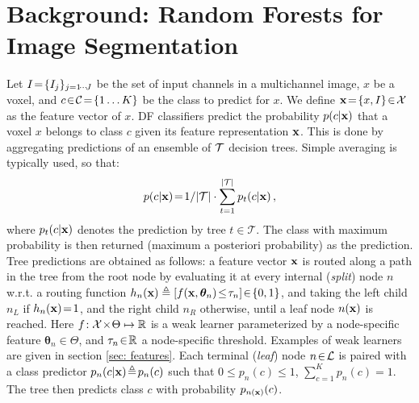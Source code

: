 
\section{Background: Random Forests for Image Segmentation}
\label{sec: background}

Let $I\!=\!\{I_j\}_{j=1\!\cdots\! J}$ be the set of input channels in a multichannel image, $x$ be a voxel, 
and $c\!\in\!\mathcal{C}\!=\!\{1 \dots K\}$ be the class to predict for $x$.
We define $\boldsymbol{\mathrm{x}}\!=\!\{x,I\}\!\in\!\mathcal{X}$ as the feature vector of $x$. DF classifiers predict the probability 
$p(c\vert\boldsymbol{\mathrm{x}})$ that a voxel $x$ belongs to class $c$ given its feature representation $\boldsymbol{\mathrm{x}}$. 
This is done by aggregating 
predictions of an ensemble of $\mathcal{T}$ decision trees. Simple averaging is typically used, so that: 
$$p(c\vert\boldsymbol{\mathrm{x}})\!=\!1/\vert\mathcal{T}\vert\cdot\sum_{t=1}^{\vert\mathcal{T}\vert}p_t(c\vert\boldsymbol{\mathrm{x}})\, ,$$
where $p_t(c\vert\boldsymbol{\mathrm{x}})$ denotes the prediction by tree $t \in \mathcal{T}$. 
The class with maximum probability is then returned (maximum a posteriori probability) as the prediction. 
Tree predictions are obtained as follows: a feature vector $\boldsymbol{\mathrm{x}}$ is routed along a path in the tree from the 
root node by evaluating it at every internal (\textit{split}) node $n$ w.r.t. a routing function 
$h_n(\boldsymbol{\mathrm{x}})\triangleq[f(\boldsymbol{\mathrm{x}},\bm{\theta}_n)\!\leq\!\tau_n]\!\in\!\{0,1\}$, and taking the 
left child $n_L$ if $h_n(\boldsymbol{\mathrm{x}})\!=\!1$, and the right child $n_R$ otherwise, until a leaf node $n(\boldsymbol{\mathrm{x}})$ is reached. 
Here $f\!:\mathcal{X}\!\times\!\Theta\mapsto\mathbb{R}$ is a weak learner parameterized by a node-specific feature 
$\bm{\theta}_n\!\in\!\Theta$, and $\tau_n\!\in\!\mathbb{R}$ a node-specific threshold. Examples of weak learners are given in section \ref{sec: features}. Each terminal (\textit{leaf}) node $n\!\in\!\mathcal{L}$ is paired with a class predictor $p_n(c\vert \boldsymbol{\mathrm{x}})\!\triangleq\!p_n(c)$ such that $0\!\leq\!p_n(c)\!\leq\!1$, $\sum_{c=1}^Kp_n(c)\!=\!1$. The tree then predicts class $c$ with probability $p_{n(\boldsymbol{\mathrm{x}})}(c)$. 


